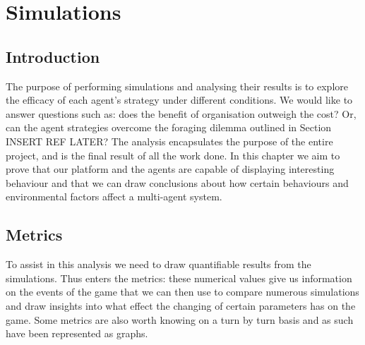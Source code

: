 \chapter{Simulations}
\section{Introduction}
\label{sec:Simulations:Intro}

The purpose of performing simulations and analysing their results is to explore the efficacy of each agent's strategy under different conditions. We would like to answer questions such as: does the benefit of organisation outweigh the cost? Or, can the agent strategies overcome the foraging dilemma outlined in Section INSERT REF LATER? The analysis encapsulates the purpose of the entire project, and is the final result of all the work done. In this chapter we aim to prove that our platform and the agents are capable of displaying interesting behaviour and that we can draw conclusions about how certain behaviours and environmental factors affect a multi-agent system.

\section{Metrics}
\label{sec:Simulations:Metric}

To assist in this analysis we need to draw quantifiable results from the simulations. Thus enters the metrics: these numerical values give us information on the events of the game that we can then use to compare numerous simulations and draw insights into what effect the changing of certain parameters has on the game. Some metrics are also worth knowing on a turn by turn basis and as such have been represented as graphs. 


